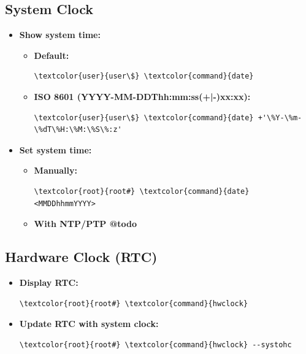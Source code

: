 \documentclass[10pt, a4paper, onecolumn, oneside, titlepage, openany]{book}
\begin{document}
\subsection{System Clock}
\label{section:date}
\begin{itemize}
    \item \textbf{Show system time:}
    \begin{itemize}
        \item \textbf{Default:}
\begin{Verbatim}[commandchars=\\\{\}]
\textcolor{user}{user\$} \textcolor{command}{date}
\end{Verbatim}
        \item \textbf{ISO 8601 (YYYY-MM-DDThh:mm:ss(+|-)xx:xx):}
\begin{Verbatim}[commandchars=\\\{\}]
\textcolor{user}{user\$} \textcolor{command}{date} +'\%Y-\%m-\%dT\%H:\%M:\%S\%:z'
\end{Verbatim}
    \end{itemize}
    \item \textbf{Set system time:}
    \begin{itemize}
        \item \textbf{Manually:}
\begin{Verbatim}[commandchars=\\\{\}]
\textcolor{root}{root#} \textcolor{command}{date} <MMDDhhmmYYYY>
\end{Verbatim}
        \item \textbf{With NTP/PTP @todo}
    \end{itemize}
\end{itemize}
\subsection{Hardware Clock (RTC)}
\begin{itemize}
    \item \textbf{Display RTC:}
\begin{Verbatim}[commandchars=\\\{\}]
\textcolor{root}{root#} \textcolor{command}{hwclock}
\end{Verbatim}
    \item \textbf{Update RTC with system clock:}
\begin{Verbatim}[commandchars=\\\{\}]
\textcolor{root}{root#} \textcolor{command}{hwclock} --systohc
\end{Verbatim}
\end{itemize}
\end{document}
